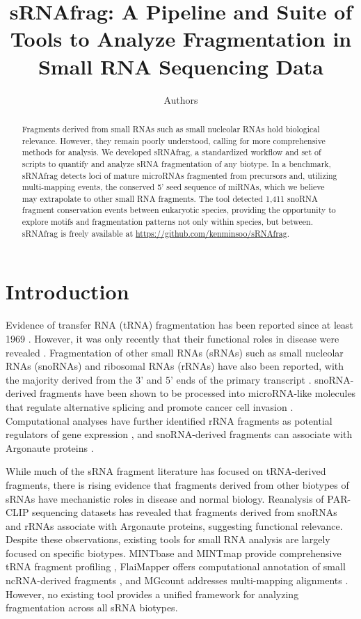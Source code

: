 \documentclass[11pt]{article}
\title{sRNAfrag: A Pipeline and Suite of Tools to Analyze Fragmentation in Small RNA Sequencing Data}
\author{Authors}
\date{}
\begin{document}
\maketitle

\begin{abstract}
Fragments derived from small RNAs such as small nucleolar RNAs hold biological relevance. However, they remain poorly understood, calling for more comprehensive methods for analysis. We developed sRNAfrag, a standardized workflow and set of scripts to quantify and analyze sRNA fragmentation of any biotype. In a benchmark, sRNAfrag detects loci of mature microRNAs fragmented from precursors and, utilizing multi-mapping events, the conserved 5' seed sequence of miRNAs, which we believe may extrapolate to other small RNA fragments. The tool detected 1,411 snoRNA fragment conservation events between eukaryotic species, providing the opportunity to explore motifs and fragmentation patterns not only within species, but between. sRNAfrag is freely available at \url{https://github.com/kenminsoo/sRNAfrag}.
\end{abstract}

\section{Introduction}

Evidence of transfer RNA (tRNA) fragmentation has been reported since at least 1969 \citep{Bayev1969}. However, it was only recently that their functional roles in disease were revealed \citep{Huang2020,Tao2022}. Fragmentation of other small RNAs (sRNAs) such as small nucleolar RNAs (snoRNAs) and ribosomal RNAs (rRNAs) have also been reported, with the majority derived from the 3' and 5' ends of the primary transcript \citep{Li2012}. snoRNA-derived fragments have been shown to be processed into microRNA-like molecules that regulate alternative splicing and promote cancer cell invasion \citep{Kishore2010,Patterson2017,Pandarakalam2022}. Computational analyses have further identified rRNA fragments as potential regulators of gene expression \citep{Peng2021}, and snoRNA-derived fragments can associate with Argonaute proteins \citep{Ender2008,Czech2020}.

While much of the sRNA fragment literature has focused on tRNA-derived fragments, there is rising evidence that fragments derived from other biotypes of sRNAs have mechanistic roles in disease and normal biology. Reanalysis of PAR-CLIP sequencing datasets has revealed that fragments derived from snoRNAs and rRNAs associate with Argonaute proteins, suggesting functional relevance. Despite these observations, existing tools for small RNA analysis are largely focused on specific biotypes. MINTbase and MINTmap provide comprehensive tRNA fragment profiling \citep{Pliatsika2018,Loher2017}, FlaiMapper offers computational annotation of small ncRNA-derived fragments \citep{Hoogstrate2015}, and MGcount addresses multi-mapping alignments \citep{Marre2022}. However, no existing tool provides a unified framework for analyzing fragmentation across all sRNA biotypes.
\end{document}
